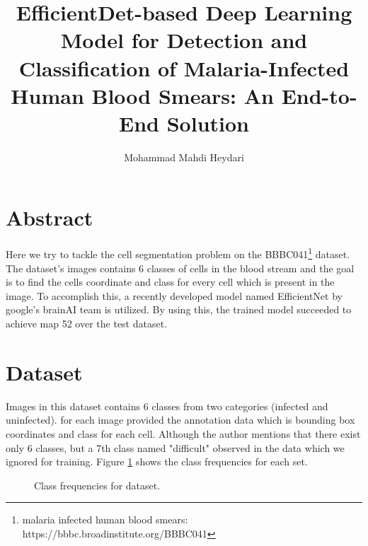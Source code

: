 \documentclass[11pt]{article}
\title{EfficientDet-based Deep Learning Model for Detection and Classification of Malaria-Infected Human Blood Smears: An End-to-End Solution}
\author{Mohammad Mahdi Heydari}
\begin{document}
\maketitle

\section{Abstract}

Here we try to tackle the cell segmentation problem on the BBBC041\footnote{malaria infected human blood smears: https://bbbc.broadinstitute.org/BBBC041} dataset. The dataset's images contains 6 classes of cells in the blood stream and the goal is to find the cells coordinate and class for every cell which is present in the image. To accomplish this, a recently developed model named EfficientNet by google's brainAI team is utilized. By using this, the trained model succeeded to achieve map 52 over the test dataset.

\section{Dataset}

Images in this dataset contains 6 classes from two categories (infected and uninfected). for each image provided the annotation data which is bounding box coordinates and class for each cell. Although the author mentions that there exist only 6 classes, but a 7th class named "difficult" observed in the data which we ignored for training. Figure \ref{fig:class_freq} shows the class frequencies for each set.

\begin{figure}[!ht]
    \centering
    \caption{Class frequencies for dataset.}
        \qquad
    \label{fig:class_freq}
\end{figure}
\end{document}
